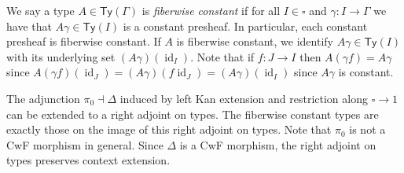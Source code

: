 \documentclass[10pt,a4paper]{article}
\newcommand\Ty{\mathsf{Ty}}
\DeclareMathOperator\id{id}
\begin{document}
We say a type \(A \in \Ty(\Gamma)\) is \emph{fiberwise constant} if for all \(I \in \square\) and \(\gamma \colon I \to \Gamma\) we have that \(A\gamma \in \Ty(I)\) is a constant presheaf.
In particular, each constant presheaf is fiberwise constant.
If \(A\) is fiberwise constant, we identify \(A\gamma \in \Ty(I)\) with its underlying set \((A\gamma)(\id_I)\).
Note that if \(f \colon J \to I\) then \(A(\gamma f) = A\gamma\) since \(A(\gamma f)(\id_J) = (A\gamma)(f\id_J) = (A\gamma)(\id_I)\) since \(A\gamma\) is constant.

The adjunction \(\pi_0 \dashv \Delta\) induced by left Kan extension and restriction along \(\square \to 1\) can be extended to a right adjoint on types.
The fiberwise constant types are exactly those on the image of this right adjoint on types.
Note that \(\pi_0\) is not a CwF morphism in general.
Since \(\Delta\) is a CwF morphism, the right adjoint on types preserves context extension.
\end{document}
